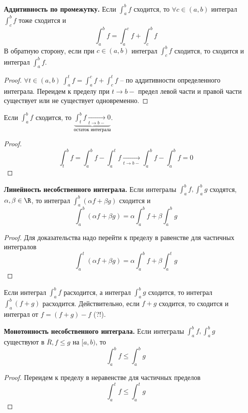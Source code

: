 \begin{MyList}
	\item \textbf{Аддитивность по промежутку.}  Если $\int_a^b f$ сходится, то $\forall c \in (a, b)$ интеграл $\int_c^b f$ тоже сходится и
	\[\int_a^b f = \int_a^c f + \int_c^b f\]	
	В обратную сторону, если при $c \in (a, b)$ интеграл $\int_c^b f$ сходится, то сходится и интеграл $\int_a^b f$.
	\begin{proof}
		$\forall t \in (a, b) \ \int_a^t f = \int_a^c f + \int_c^t f$ -- по аддитивности определенного интеграла.
		Переидем к пределу при $t \to b-$ предел левой части и правой части существует или не существует одновременно.
	\end{proof}

	\item Если $\int_a^b f$ сходится, то $\underbrace{\int_t^b f \xrightarrow[t \to b-]{} 0}_{\text{остаток интеграла}}$.
	\begin{proof}
		\[\int_t^b f = \int_a^b f - \int_a^t f \xrightarrow[t \to b-]{}\int_a^b f - \int_a^b f = 0\]
	\end{proof}

	\item \textbf{Линейность несобственного интеграла.}  Если интегралы $\int_a^b f, \int_a^b g$ сходятся, $\alpha, \beta \in \R$, то интеграл $\int_a^b(\alpha f + \beta g)$ сходится и
	\[\int_a^b (\alpha f + \beta g) = \alpha\int_a^b f + \beta\int_a^b g\]
	\begin{proof}
		Для доказательства надо перейти к пределу в равенстве для частичных интегралов
		\[\int_a^t (\alpha f + \beta g) = \alpha \int_a^b f + \beta \int_a^t g\]
	\end{proof}

	\begin{Rem}
		Если интеграл $\int_a^b f$ расходится, а интеграл $\int_a^b g$ сходится, то интеграл $\int_a^b(f + g)$ расходится.
		Действительно, если $f + g$ сходится, то сходится и интеграл от $f = (f + g) - f$ (?!).
	\end{Rem}

	\item \textbf{Монотонность несобственного интеграла.} Если интегралы $\int_a^b f, \int_a^b g$ существуют в $\overline{R}, f \leqslant g$ на $[a, b)$, то
	\[\int_a^b f \leqslant \int_a^b g\]

	\begin{proof}
		Переидем к пределу в неравенстве для частичных пределов
		\[\int_a^t f \leqslant \int_a^t g\]	
	\end{proof}


\end{MyList}
